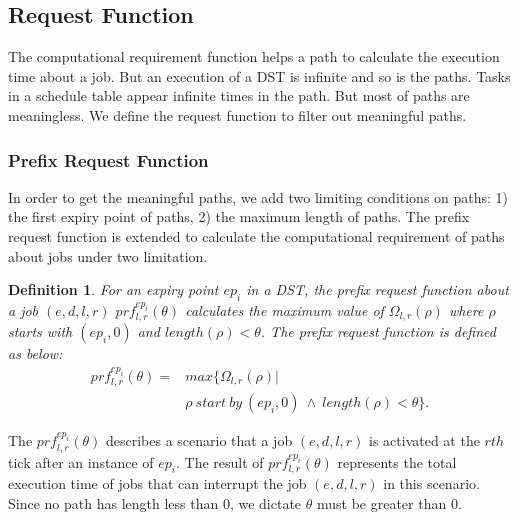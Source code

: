 \documentclass[10pt,conference]{IEEEtran}
\newtheorem{definition}{Definition}
\begin{document}
\subsection{Request Function}\label{section_prf}
The computational requirement function helps a path to calculate the execution time about a job. But an execution of a DST is infinite and so is the paths. Tasks in a schedule table appear infinite times in the path. But most of paths are meaningless. %
We define the request function to filter out meaningful paths.

\subsubsection{Prefix Request Function}
In order to get the meaningful paths, we add two limiting conditions on paths: 1) the first expiry point of paths, 2) the maximum length of paths. The prefix request function \cite{DBLP:journals/rts/Stigge015a} is extended to calculate the computational requirement of paths about jobs under two limitation.
\begin{definition}
For an expiry point $ep_i$ in a DST, the prefix request function about a job $(e,d,l,r)$ $prf^{ep_i}_{l,r}(\theta)$ calculates the maximum value of $\Omega_{l,r}(\rho)$ where $\rho$ starts with $(ep_i,0)$ and $length(\rho)<\theta$. The prefix request function is defined as below:
\begin{equation}\label{equation_prf}\begin{split}
prf^{ep_i}_{l,r}(\theta)=&max\{\Omega_{l,r}(\rho)|
\\
&\rho \ start\ by\ (ep_i,0)\ \wedge\ length(\rho)<\theta\}.
\end{split}\end{equation}
\end{definition}
The $prf^{ep_i}_{l,r}(\theta)$ describes a scenario that a job $(e,d,l,r)$ is activated at the $rth$ tick after an instance of $ep_i$. The result of $prf^{ep_i}_{l,r}(\theta)$ represents the total execution time of jobs that can interrupt the job $(e,d,l,r)$ in this scenario. Since no path has length less than 0, we dictate $\theta$ must be greater than $0$.
\end{document}
